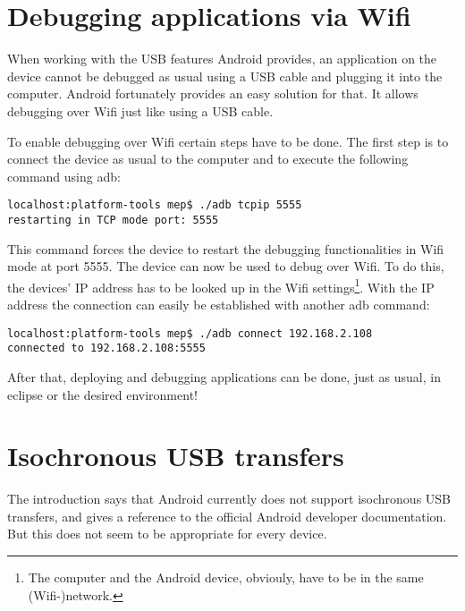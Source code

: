 \chapter{Debugging applications via Wifi}
\label{chapter:DetailedDescriptions}

When working with the USB features Android provides, an application on the device cannot be debugged as usual using a USB cable and plugging it into the computer. Android fortunately provides an easy solution for that. It allows debugging over Wifi just like using a USB cable.

To enable debugging over Wifi certain steps have to be done. The first step is to connect the device as usual to the computer and to execute the following command using adb:

\lstset{language=bash}
\begin{lstlisting}[caption=Restarting the device in Wifi debug mode, label=listing:wifi_debug]
localhost:platform-tools mep$ ./adb tcpip 5555
restarting in TCP mode port: 5555
\end{lstlisting}

This command forces the device to restart the debugging functionalities in Wifi mode at port 5555. The device can now be used to debug over Wifi. To do this, the devices' IP address has to be looked up in the Wifi settings\footnote{The computer and the Android device, obviouly, have to be in the same (Wifi-)network.}. With the IP address the connection can easily be established with another adb command:

 \begin{lstlisting}[caption=Connecting to the device over Wifi, label=listing:wifi_connect]
localhost:platform-tools mep$ ./adb connect 192.168.2.108
connected to 192.168.2.108:5555
 \end{lstlisting}
 
 After that, deploying and debugging applications can be done, just as usual, in eclipse or the desired environment!

\chapter{Isochronous USB transfers}

The introduction says that Android currently does not support isochronous USB transfers, and gives a reference to the official Android developer documentation\cite{android_usb_constants}. But this does not seem to be appropriate for every device.

